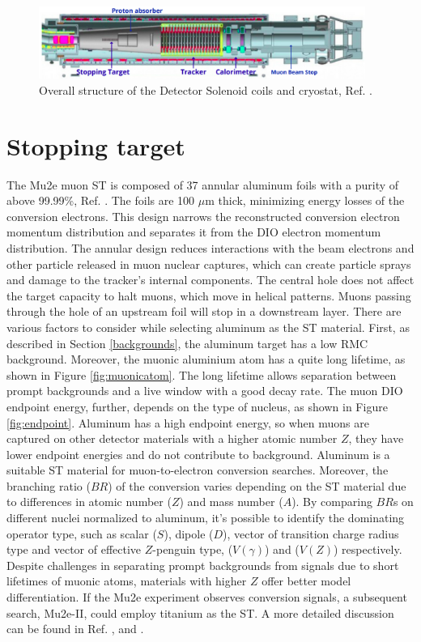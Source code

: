 \begin{figure}[!h]
\centering
\includegraphics[width =0.95\textwidth]{figures/png/Screenshot_20240306_225639.png}
\caption{Overall structure of the Detector Solenoid coils and cryostat, Ref. \cite{bobbb}.}
\label{fig:DS}
\end{figure}
\section{Stopping target}
The Mu2e muon ST is composed of 37 annular aluminum foils  with a purity of above 99.99\%, Ref. \cite{bobbb}. The foils are 100 $\mu$m thick, minimizing energy losses of the conversion electrons. This design narrows the reconstructed conversion electron momentum distribution and separates it from the DIO electron momentum distribution. The annular design reduces interactions with the beam electrons and other particle released in muon nuclear captures, which can create particle sprays and damage to the tracker's internal components. The central hole does not affect the target capacity to halt muons, which move in helical patterns. Muons passing through the hole of an upstream foil will stop in a downstream layer. There are various factors to consider while selecting aluminum as the ST material. First, as described in Section \ref{backgrounds}, the aluminum target has a low RMC background. Moreover, the muonic aluminium atom has a quite long lifetime, as shown in Figure \ref{fig:muonicatom}. The long lifetime allows separation between prompt backgrounds and a live window with a good decay rate. The muon DIO endpoint energy, further, depends on the type of nucleus, as shown in Figure \ref{fig:endpoint}. Aluminum has a high endpoint energy, so when muons are captured on other detector materials with a higher atomic number $Z$, they have lower endpoint energies and do not contribute to background. Aluminum is a suitable ST material for muon-to-electron conversion searches.
Moreover, the branching ratio ($BR$) of the conversion varies depending on the ST material due to differences in atomic number ($Z$) and mass number ($A$). By comparing $BR$s on different nuclei normalized to aluminum, it's possible to identify the dominating operator type, such as scalar ($S$), dipole ($D$), vector of transition charge radius type and vector of effective $Z$-penguin type, ($V(\gamma)$) and ($V(Z)$) respectively. Despite challenges in separating prompt backgrounds from signals due to short lifetimes of muonic atoms, materials with higher $Z$ offer better model differentiation. If the Mu2e experiment observes conversion signals, a subsequent search, Mu2e-II, could employ titanium as the ST. A more detailed discussion can be found in Ref. \cite{PhysRevD.80.013002}, \cite{PhysRevD.76.059902} and \cite{abusalma2018expression}.
